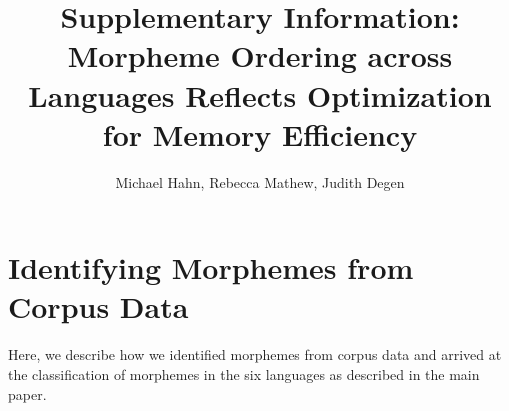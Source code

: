 \documentclass[11pt,letterpaper]{article}
\title{Supplementary Information: Morpheme Ordering across Languages Reflects Optimization for Memory Efficiency}
\author{Michael Hahn, Rebecca Mathew, Judith Degen}
\begin{document}
\maketitle

\tableofcontents





\section{Identifying Morphemes from Corpus Data}

Here, we describe how we identified morphemes from corpus data and arrived at the classification of morphemes in the six languages as described in the main paper.



    
\end{document}
